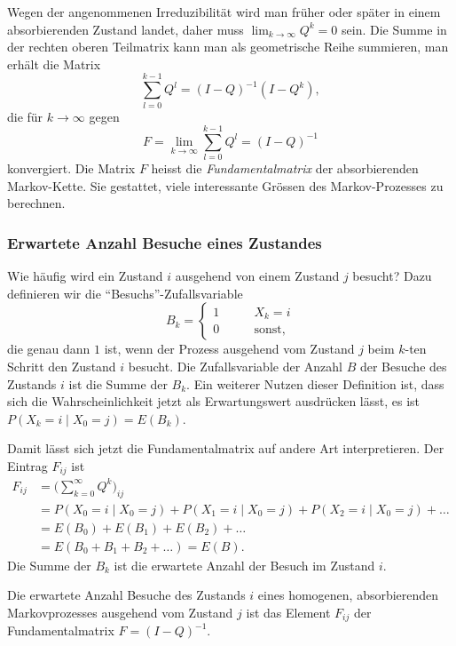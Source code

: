Wegen der angenommenen Irreduzibilität wird man
früher oder später in einem absorbierenden Zustand landet,
daher muss $\lim_{k\to\infty} Q^k=0$ sein.
Die Summe in der rechten oberen Teilmatrix kann man als geometrische
Reihe summieren, man erhält die Matrix
\[
\sum_{l=0}^{k-1} Q^l = (I-Q)^{-1}(I-Q^k),
\]
die für $k\to\infty$ gegen
\[
F
=
\lim_{k\to\infty} \sum_{l=0}^{k-1} Q^l
=
(I-Q)^{-1}
\]
konvergiert.
Die Matrix $F$ heisst die {\em Fundamentalmatrix} der absorbierenden
Markov-Kette.
%
Sie gestattet, viele interessante Grössen des Markov-Prozesses zu
berechnen.

\subsubsection{Erwartete Anzahl Besuche eines Zustandes}
Wie häufig wird ein Zustand $i$ ausgehend von einem Zustand $j$
besucht?
%
Dazu definieren wir die ``Besuchs''-Zufallsvariable
\[
B_{k}=\begin{cases}
1&\qquad\text{$X_k=i$}\\
0&\qquad\text{sonst,}
\end{cases}
\]
die genau dann $1$ ist, wenn der Prozess ausgehend vom Zustand $j$
beim $k$-ten Schritt den Zustand $i$ besucht.
Die Zufallsvariable der Anzahl $B$ der Besuche des Zustands $i$ ist die
Summe der $B_k$.
Ein weiterer Nutzen dieser Definition ist, dass sich die Wahrscheinlichkeit
jetzt als Erwartungswert ausdrücken lässt, es ist
$P(X_k=i \mid X_0=j) = E(B_k)$.

Damit lässt sich jetzt die Fundamentalmatrix auf andere Art interpretieren.
Der Eintrag $F_{i\!j}$ ist
\begin{align*}
F_{i\!j}
&=
\biggl(\sum_{k=0}^\infty Q^k\biggr)_{i\!j}
\\
&=
P(X_0=i\mid X_0=j)
+
P(X_1=i\mid X_0=j)
+
P(X_2=i\mid X_0=j)
+\dots
\\
&=E(B_0) + E(B_1) + E(B_2) + \dots
\\
&=E(B_0+B_1+B_2+\dots)
=E(B).
\end{align*}
Die Summe der $B_k$ ist die erwartete Anzahl der Besuch im Zustand $i$.

\begin{satz}
\label{buch:markov:satz:anzahlbesuche}
Die erwartete Anzahl Besuche des Zustands $i$ eines homogenen,
absorbierenden Markovprozesses ausgehend vom Zustand $j$ ist das
Element $F_{i\!j}$ der Fundamentalmatrix $F=(I-Q)^{-1}$.
\end{satz}

